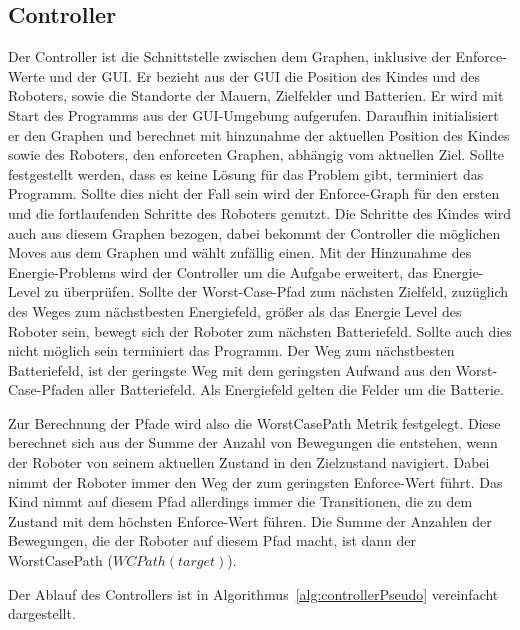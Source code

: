 \subsection{Controller}
Der Controller ist die Schnittstelle zwischen dem Graphen, inklusive der Enforce-Werte und der GUI. Er bezieht aus der GUI die Position des Kindes und des Roboters, sowie die Standorte der Mauern, Zielfelder und Batterien. Er wird mit Start des Programms aus der GUI-Umgebung aufgerufen. Daraufhin initialisiert er den Graphen und berechnet mit hinzunahme der aktuellen Position des Kindes sowie des Roboters, den enforceten Graphen, abhängig vom aktuellen Ziel. Sollte festgestellt werden, dass es keine Lösung für das Problem gibt, terminiert das Programm. Sollte dies nicht der Fall sein wird der Enforce-Graph für den ersten und die fortlaufenden Schritte des Roboters genutzt. Die Schritte des Kindes wird auch aus diesem Graphen bezogen, dabei bekommt der Controller die möglichen Moves aus dem Graphen und wählt zufällig einen. Mit der Hinzunahme des Energie-Problems wird der Controller um die Aufgabe erweitert, das Energie-Level zu überprüfen. Sollte der Worst-Case-Pfad zum nächsten Zielfeld, zuzüglich des Weges zum nächstbesten Energiefeld, größer als das Energie Level des Roboter sein, bewegt sich der Roboter zum nächsten Batteriefeld. Sollte auch dies nicht möglich sein terminiert das Programm. Der Weg zum nächstbesten Batteriefeld, ist der geringste Weg mit dem geringsten Aufwand aus den Worst-Case-Pfaden aller Batteriefeld. Als Energiefeld gelten die Felder um die Batterie.

Zur Berechnung der Pfade wird also die WorstCasePath Metrik festgelegt. Diese berechnet sich aus der Summe der Anzahl von Bewegungen die entstehen, wenn der Roboter von seinem aktuellen Zustand in den Zielzustand navigiert. Dabei nimmt der Roboter immer den Weg der zum geringsten Enforce-Wert führt. Das Kind nimmt auf diesem Pfad allerdings immer die Transitionen, die zu dem Zustand mit dem höchsten Enforce-Wert führen. Die Summe der Anzahlen der Bewegungen, die der Roboter auf diesem Pfad macht, ist dann der WorstCasePath ($WCPath(target)$).

Der Ablauf des Controllers ist in Algorithmus~\autoref{alg:controllerPseudo} vereinfacht dargestellt.


